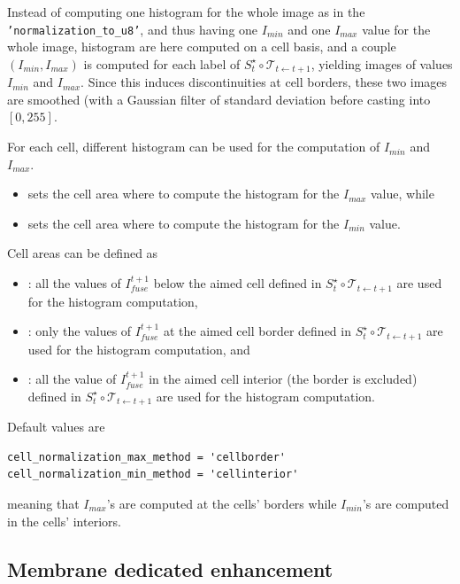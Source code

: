\begin{itemize}
Instead of computing one histogram for the whole image as in the \texttt{'normalization\_to\_u8'}, and thus having one $I_{min}$ and one $I_{max}$ value for the whole image, histogram are here computed on a cell basis, and a couple $(I_{min}, I_{max})$ is computed for each label of $S^{\star}_t \circ \mathcal{T}_{t \leftarrow t+1}$, yielding images of values $I_{min}$ and $I_{max}$. Since this induces discontinuities at cell borders, these two images are smoothed (with a Gaussian filter of standard deviation  before casting into $[0, 255]$.

For each cell, different histogram can be used for the computation of $I_{min}$ and $I_{max}$.
\begin{itemize}
\itemsep -0.5ex
\item {} sets the cell area where to compute the histogram for the $I_{max}$ value, while
\item {} sets the cell area where to compute the histogram for the $I_{min}$ value.
\end{itemize}

Cell areas can be defined as
\begin{itemize}
\itemsep -0.5ex
\item {}: all the values of $I^{t+1}_{fuse}$ below the aimed cell defined in $S^{\star}_t \circ \mathcal{T}_{t \leftarrow t+1}$ are used for the histogram computation, 
\item {}: only the values of $I^{t+1}_{fuse}$ at the aimed cell border defined in $S^{\star}_t \circ \mathcal{T}_{t \leftarrow t+1}$ are used for the histogram computation, and 
\item {}: all the value of $I^{t+1}_{fuse}$ in the aimed cell interior (the border is excluded) defined in $S^{\star}_t \circ \mathcal{T}_{t \leftarrow t+1}$ are used for the histogram computation.
\end{itemize}

Default values are 
\begin{verbatim}
cell_normalization_max_method = 'cellborder'
cell_normalization_min_method = 'cellinterior'
\end{verbatim}
meaning that $I_{max}$'s are computed at the cells' borders while $I_{min}$'s are computed in the cells' interiors. 
\end{itemize}


\subsection{Membrane dedicated enhancement}

